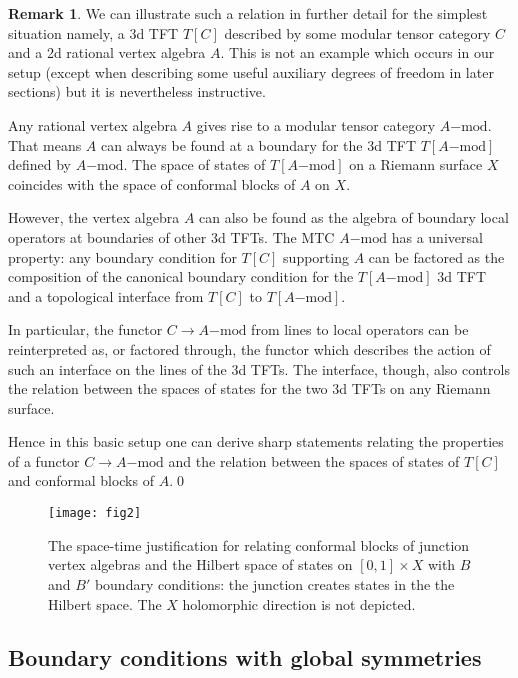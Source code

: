 \documentclass[11pt,reqno]{amsart}
\theoremstyle{plain}
\numberwithin{equation}{section}
\theoremstyle{definition}
\newtheorem{rem}{Remark}[section]
\begin{document}
\begin{rem} We can illustrate such a relation in further detail for
  the simplest situation namely, a 3d TFT $T[C]$ described by some
  modular tensor category $C$ and a 2d rational vertex algebra
  $A$. This is not an example which occurs in our setup (except when
  describing some useful auxiliary degrees of freedom in later
  sections) but it is nevertheless instructive.

  Any rational vertex algebra $A$ gives rise to a modular tensor
  category $A\mathrm{-mod}$. That means $A$ can always be found at a
  boundary for the 3d TFT $T[A\mathrm{-mod}]$ defined by
  $A\mathrm{-mod}$.  The space of states of $T[A\mathrm{-mod}]$ on a
  Riemann surface $X$ coincides with the space of conformal blocks of
  $A$ on $X$.

  However, the vertex algebra $A$ can also be found as the
  algebra of boundary local operators at boundaries of other 3d TFTs.
  The MTC $A\mathrm{-mod}$ has a universal property: any boundary
  condition for $T[C]$ supporting $A$ can be factored as the
  composition of the canonical boundary condition for the
  $T[A\mathrm{-mod}]$ 3d TFT and a topological interface from $T[C]$
  to $T[A\mathrm{-mod}]$.

  In particular, the functor $C \to A\mathrm{-mod}$ from lines to
  local operators can be reinterpreted as, or factored through, the
  functor which describes the action of such an interface on the lines
  of the 3d TFTs. The interface, though, also controls the relation
  between the spaces of states for the two 3d TFTs on any Riemann
  surface.

  Hence in this basic setup one can derive sharp statements relating
  the properties of a functor $C \to A\mathrm{-mod}$ and the
  relation between the spaces of states of $T[C]$ and conformal blocks
  of $A$.\qed
\end{rem}

\begin{figure}
\center
\texttt{[image: fig2]}
\caption{The space-time justification for relating conformal blocks of
  junction vertex algebras
and the Hilbert space of states on $[0,1] \times X$ with $B$ and $B'$
boundary conditions: the junction creates
states in the the Hilbert space. The $X$ holomorphic direction is not
depicted.} \label{fig2}
\end{figure}

\subsection{Boundary conditions with global symmetries}
\end{document}
